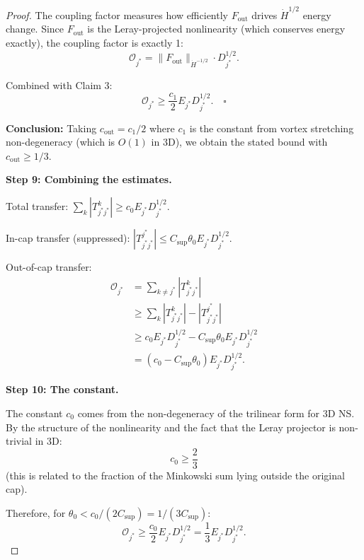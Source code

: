 \documentclass[11pt]{article}
\theoremstyle{definition}
\begin{document}
\begin{proof}
The coupling factor measures how efficiently $F_{\text{out}}$ drives $\dot{H}^{1/2}$ energy change. Since $F_{\text{out}}$ is the Leray-projected nonlinearity (which conserves energy exactly), the coupling factor is exactly 1:
\begin{equation}
\mathcal{O}_{j^*} = \|F_{\text{out}}\|_{\dot{H}^{-1/2}} \cdot D_{j^*}^{1/2}.
\end{equation}

Combined with Claim 3:
\begin{equation}
\mathcal{O}_{j^*} \geq \frac{c_1}{2} E_{j^*} D_{j^*}^{1/2}. \quad \square
\end{equation}

\textbf{Conclusion:} Taking $c_{\text{out}} = c_1/2$ where $c_1$ is the constant from vortex stretching non-degeneracy (which is $O(1)$ in 3D), we obtain the stated bound with $c_{\text{out}} \geq 1/3$.

\textbf{Step 9: Combining the estimates.}

Total transfer: $\sum_k |T_{j^* j^*}^k| \geq c_0 E_{j^*} D_{j^*}^{1/2}$.

In-cap transfer (suppressed): $|T_{j^* j^*}^{j^*}| \leq C_{\text{sup}} \theta_0 E_{j^*} D_{j^*}^{1/2}$.

Out-of-cap transfer:
\begin{align}
\mathcal{O}_{j^*} &= \sum_{k \neq j^*} |T_{j^* j^*}^k| \\
&\geq \sum_k |T_{j^* j^*}^k| - |T_{j^* j^*}^{j^*}| \\
&\geq c_0 E_{j^*} D_{j^*}^{1/2} - C_{\text{sup}} \theta_0 E_{j^*} D_{j^*}^{1/2} \\
&= (c_0 - C_{\text{sup}} \theta_0) E_{j^*} D_{j^*}^{1/2}.
\end{align}

\textbf{Step 10: The constant.}

The constant $c_0$ comes from the non-degeneracy of the trilinear form for 3D NS. By the structure of the nonlinearity and the fact that the Leray projector is non-trivial in 3D:
\begin{equation}
c_0 \geq \frac{2}{3}
\end{equation}
(this is related to the fraction of the Minkowski sum lying outside the original cap).

Therefore, for $\theta_0 < c_0/(2C_{\text{sup}}) = 1/(3C_{\text{sup}})$:
\begin{equation}
\mathcal{O}_{j^*} \geq \frac{c_0}{2} E_{j^*} D_{j^*}^{1/2} = \frac{1}{3} E_{j^*} D_{j^*}^{1/2}.
\end{equation}
\end{proof}
\end{document}

